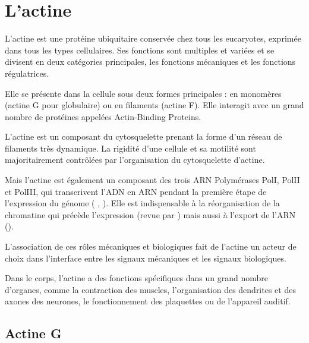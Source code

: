 \documentclass{report}
\begin{document}
\chapter{L'actine}

L'actine est une protéine ubiquitaire conservée chez tous les eucaryotes, exprimée dans tous les types cellulaires. 
Ses fonctions sont multiples et variées et se divisent en deux catégories principales, les fonctions mécaniques et les fonctions régulatrices. 

Elle se présente dans la cellule sous deux formes principales : en monomères (actine G pour globulaire) ou en filaments (actine F). 
Elle interagit avec un grand nombre de protéines appelées Actin-Binding Proteins. 

L'actine est un composant du cytosquelette prenant la forme d'un réseau de filaments très dynamique. La rigidité d'une cellule et sa motilité sont majoritairement contrôlées par l'organisation du cytosquelette d'actine. 

Mais l'actine est également un composant des trois ARN Polymérases PolI, PolII et PolIII, qui transcrivent l'ADN en ARN pendant la première étape de l'expression du génome ( \cite{ye_nuclear_2008}, \cite{hofmann_actin_2004} \cite{hu_role_2004}). 
Elle est indispensable à la réorganisation de la chromatine qui précède l'expression (revue par \cite{farrants_chromatin_2008}) mais aussi à l'export de l'ARN (\cite{hofmann_cofactor_2001}).  

L'association de ces rôles mécaniques et biologiques fait de l'actine un acteur de choix dans l'interface entre les signaux mécaniques et les signaux biologiques. 

Dans le corps, l'actine a des fonctions spécifiques dans un grand nombre d'organes, comme la contraction des muscles, l'organisation des dendrites et des axones des neurones, le fonctionnement des plaquettes ou de l'appareil auditif. 



\section{Actine G}
\end{document}
